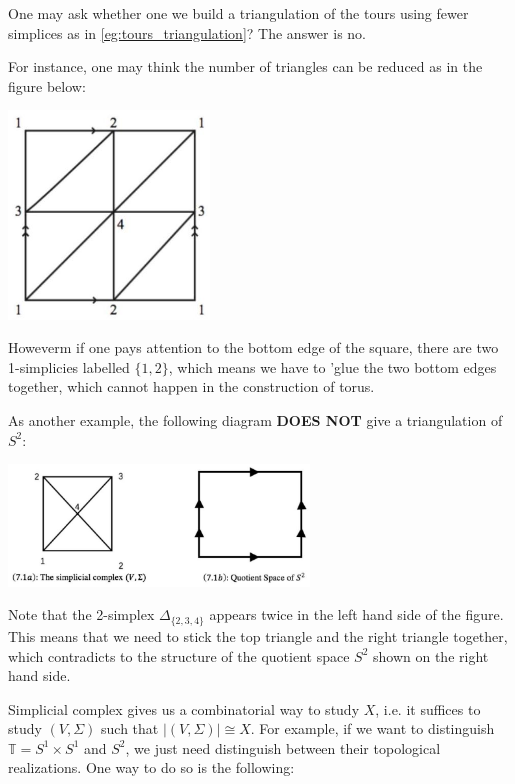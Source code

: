 \begin{example}
One may ask whether one we build a triangulation of the tours using fewer simplices as in \autoref{eg:tours_triangulation}? The answer is no. 

For instance, one may think the number of triangles can be reduced as in the figure below: 
\begin{center}
\includegraphics[width=0.4\textwidth]{images/Ch4_turous_nonex.jpg}
\end{center}
Howeverm if one pays attention to the bottom edge of the square, there are two 1-simplicies labelled \(\{ 1,2\}\), which means we have to 'glue the two bottom edges together, which cannot happen in the construction of torus.

As another example, the following diagram {\bf DOES NOT} give a triangulation of $S^2$:
\begin{center}
\includegraphics[width=0.6\textwidth]{images/Ch4_S2_nonex.jpg}
\end{center}
Note that the 2-simplex \({\Delta }_{\{ 2,3,4\} }\) appears twice in the left hand side of the figure. This means that we need to stick the top triangle and the right triangle together, which contradicts to the structure of the quotient space \({S}^{2}\) shown on the right hand side.
\end{example}

Simplicial complex gives us a combinatorial way to study \(X\), i.e. it suffices to study \(\left( {V,\Sigma }\right)\) such that \(\left| \left( {V,\Sigma }\right) \right|  \cong  X\). 
For example, if we want to distinguish \(\mathbb{T} = {S}^{1} \times  {S}^{1}\) and \({S}^{2}\), we just need  distinguish between their topological realizations. One way to do so is the following:


